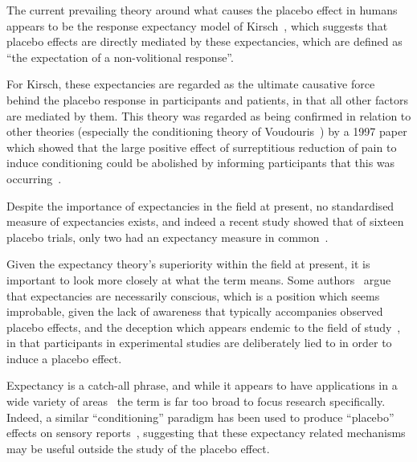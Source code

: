 The current prevailing theory around what causes the placebo effect in humans appears to be the response expectancy model of Kirsch~\cite{Kirsch1985,Kirsch1997}, which suggests that placebo effects are directly mediated by these expectancies, which are defined as ``the expectation of a non-volitional response''.

For Kirsch, these expectancies are regarded as the ultimate causative force behind the placebo response in participants and patients, in that all other factors are mediated by them. This theory was regarded as being confirmed in relation to other theories (especially the conditioning theory of Voudouris~\cite{Voudouris1985}) by a 1997 paper which showed that the large positive effect of surreptitious reduction of pain to induce conditioning could be abolished by informing participants that this was occurring~\cite{Montgomery1997}.

Despite the importance of expectancies in the field at present, no standardised measure of expectancies exists, and indeed a recent study showed that of sixteen placebo trials, only two had an expectancy measure in common~\cite{myers2008patient}. 

Given the expectancy theory's superiority within the field at present, it is important to look more closely at what the term means. Some authors~\cite{Stewart-Williams2004a}  argue that expectancies are necessarily conscious, which is a position which seems improbable, given the lack of awareness that typically accompanies observed placebo effects, and the deception which appears endemic to the field of study~\cite{Miller2008a,Miller2008}, in that participants in experimental studies are deliberately lied to in order to induce a placebo effect. 

Expectancy is a catch-all phrase, and while it appears to have applications in a wide variety of areas~\cite{Montgomery2007} the term is far too broad to focus research specifically. Indeed, a similar ``conditioning'' paradigm has been used to produce ``placebo'' effects on sensory reports~\cite{Sterzer2008}, suggesting that these expectancy related mechanisms may be useful outside the study of the placebo effect. 







